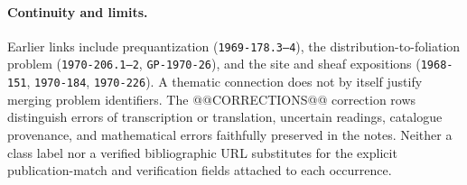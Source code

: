 \paragraph{Continuity and limits.}
Earlier links include prequantization (\texttt{1969-178.3--4}),
the distribution-to-foliation problem (\texttt{1970-206.1--2},
\texttt{GP-1970-26}), and the
site and sheaf expositions (\texttt{1968-151}, \texttt{1970-184},
\texttt{1970-226}).  A thematic connection does not by itself justify merging
problem identifiers.  The @@CORRECTIONS@@ correction rows distinguish errors
of transcription or translation, uncertain readings, catalogue provenance,
and mathematical errors faithfully preserved in the notes.  Neither a
class label nor a verified bibliographic URL substitutes for the explicit
publication-match and verification fields attached to each occurrence.
\clearpage
